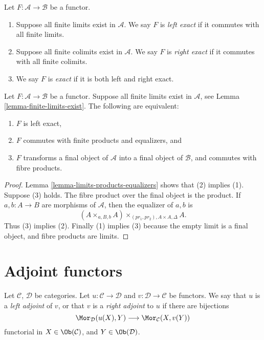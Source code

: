 \begin{definition}
\label{definition-exact}
Let $F : \mathcal{A} \to \mathcal{B}$ be a functor.
\begin{enumerate}
\item Suppose all finite limits exist in $\mathcal{A}$.
We say $F$ is {\it left exact} if it commutes
with all finite limits.
\item Suppose all finite colimits exist in $\mathcal{A}$.
We say $F$ is {\it right exact} if it commutes
with all finite colimits.
\item We say $F$ is {\it exact} if it is both left and right
exact.
\end{enumerate}
\end{definition}

\begin{lemma}
\label{lemma-characterize-left-exact}
Let $F : \mathcal{A} \to \mathcal{B}$ be a functor.
Suppose all finite limits exist in $\mathcal{A}$,
see Lemma \ref{lemma-finite-limits-exist}.
The following are equivalent:
\begin{enumerate}
\item $F$ is left exact,
\item $F$ commutes with finite products and equalizers, and
\item $F$ transforms a final object of $\mathcal{A}$
into a final object of $\mathcal{B}$, and commutes with fibre products.
\end{enumerate}
\end{lemma}

\begin{proof}
Lemma \ref{lemma-limits-products-equalizers} shows that (2) implies (1).
Suppose (3) holds. The fibre product over the final object is the product.
If $a, b : A \to B$ are morphisms of $\mathcal{A}$, then the
equalizer of $a, b$ is
$$
(A \times_{a, B, b} A)\times_{(pr_1, pr_2), A \times A, \Delta} A.
$$
Thus (3) implies (2). Finally (1) implies (3) because
the empty limit is a final object, and fibre products are limits.
\end{proof}


\section{Adjoint functors}
\label{section-adjoint}

\begin{definition}
\label{definition-adjoint}
Let $\mathcal{C}$, $\mathcal{D}$ be categories.
Let $u : \mathcal{C} \to \mathcal{D}$ and
$v : \mathcal{D} \to \mathcal{C}$ be functors.
We say that $u$ is a {\it left adjoint} of $v$, or that
$v$ is a {\it right adjoint} to $u$ if there are bijections
$$
\Mor_\mathcal{D}(u(X), Y)
\longrightarrow
\Mor_\mathcal{C}(X, v(Y))
$$
functorial in $X \in \Ob(\mathcal{C})$, and
$Y \in \Ob(\mathcal{D})$.
\end{definition}

